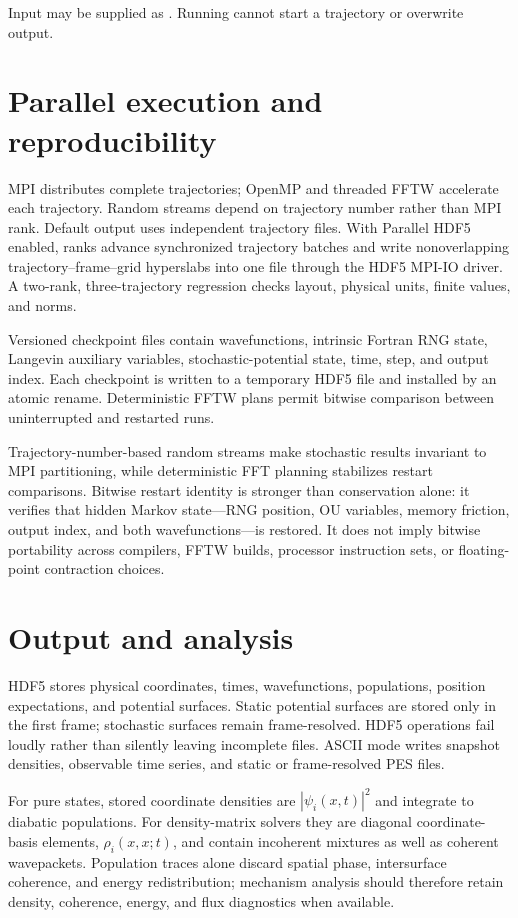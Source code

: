 \documentclass[11pt]{article}
\newcommand{\code}[1]{\texttt{\detokenize{#1}}}
\begin{document}
Input may be supplied as \code{./qle_1d INPUT.nml}. Running
\code{./qle_1d --help} cannot start a trajectory or overwrite output.

\section{Parallel execution and reproducibility}

MPI distributes complete trajectories; OpenMP and threaded FFTW accelerate each
trajectory. Random streams depend on trajectory number rather than MPI rank.
Default output uses independent trajectory files. With Parallel HDF5 enabled,
ranks advance synchronized trajectory batches and write nonoverlapping
trajectory--frame--grid hyperslabs into one \code{*.ensemble.h5} file through
the HDF5 MPI-IO driver. A two-rank, three-trajectory regression checks layout,
physical units, finite values, and norms.

Versioned checkpoint files contain wavefunctions, intrinsic Fortran RNG state,
Langevin auxiliary variables, stochastic-potential state, time, step, and output
index. Each checkpoint is written to a temporary HDF5 file and installed by an
atomic rename. Deterministic FFTW plans permit bitwise comparison between
uninterrupted and restarted runs.

Trajectory-number-based random streams make stochastic results invariant to MPI
partitioning, while deterministic FFT planning stabilizes restart comparisons.
Bitwise restart identity is stronger than conservation alone: it verifies that hidden
Markov state---RNG position, OU variables, memory friction, output index, and both
wavefunctions---is restored. It does not imply bitwise portability across compilers,
FFTW builds, processor instruction sets, or floating-point contraction choices.

\section{Output and analysis}

HDF5 stores physical coordinates, times, wavefunctions, populations, position
expectations, and potential surfaces. Static potential surfaces are stored only
in the first frame; stochastic surfaces remain frame-resolved. HDF5 operations
fail loudly rather than silently leaving incomplete files. ASCII mode writes
snapshot densities, observable time series, and static or frame-resolved PES
files.

For pure states, stored coordinate densities are $|\psi_i(x,t)|^2$ and integrate to
diabatic populations. For density-matrix solvers they are diagonal coordinate-basis
elements, $\rho_i(x,x;t)$, and contain incoherent mixtures as well as coherent
wavepackets. Population traces alone discard spatial phase, intersurface coherence,
and energy redistribution; mechanism analysis should therefore retain density,
coherence, energy, and flux diagnostics when available.
\end{document}
